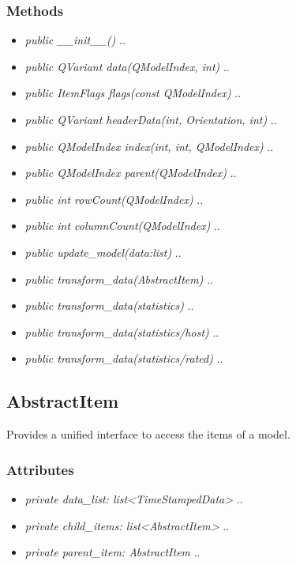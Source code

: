 \subsubsection{Methods}
\begin{itemize}
  \item \textit{public \_\_init\_\_()}
  ..
  \item \textit{public QVariant data(QModelIndex, int)}
  ..
  \item \textit{public ItemFlags flags(const QModelIndex)}
  ..
  \item \textit{public QVariant headerData(int, Orientation, int)}
  ..
  \item \textit{public QModelIndex index(int, int, QModelIndex)}
  ..
  \item \textit{public QModelIndex parent(QModelIndex)}
  ..
  \item \textit{public int rowCount(QModelIndex)}
  ..
  \item \textit{public int columnCount(QModelIndex)}
  ..
  \item \textit{public update\_model(data:list)}
  ..
  \item \textit{public transform\_data(AbstractItem)}
  ..
  \item \textit{public transform\_data(statistics)}
  ..
  \item \textit{public transform\_data(statistics/host)}
  ..
  \item \textit{public transform\_data(statistics/rated)}
  ..
  \end{itemize}

\subsection{AbstractItem}
Provides a unified interface to access the items of a model.
\subsubsection{Attributes}
\begin{itemize}
  \item \textit{private data\_list: list<TimeStampedData>}
  ..
  \item \textit{private child\_items: list<AbstractItem>}
  ..
  \item \textit{private parent\_item: AbstractItem}
  ..
\end{itemize}
